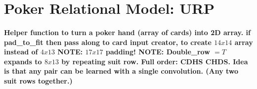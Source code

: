 \documentclass[review]{elsarticle}
\begin{document}





\section{Poker Relational Model: URP}
\paragraph{Helper function to turn a poker hand (array of cards) into 2D array.
if pad\_to\_fit then pass along to card input creator, to create $14x14$ array instead of $4x13$
NOTE: $17x17$ padding!
NOTE: Double\_row $= T$ expands to $8x13$ by repeating suit row. Full order: CDHS CHDS.
Idea is that any pair can be learned with a single convolution. (Any two suit rows together.)}
\end{document}

